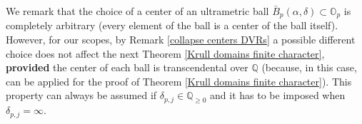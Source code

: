\documentclass[10pt]{article}
\numberwithin{equation}{section}
\newtheorem{Lem}[equation]{Lemma}
\theoremstyle{definition}
\newtheorem{Def}[equation]{Definition}
\theoremstyle{definition}
\newcommand{\Q}{\mathbb{Q}}
\newcommand{\Z}{\mathbb{Z}}
\renewcommand{\O}{\mathbb{O}}
\newcommand{\PP}{\mathbb{P}}
\newcommand\rc { \color{red}}
\begin{document}
We remark that the choice of a center of an ultrametric ball $\bar B_p(\alpha,\delta)\subset \O_p$ is completely arbitrary (every element of the ball is a center of the ball itself). However, for our scopes, by Remark \ref{collapse centers DVRs}
 a possible different choice does not affect the next Theorem \ref{Krull domains finite character}, \textbf{provided} the center of each  ball is transcendental over $\Q$ 
  (because, in this case, \cite[Lemma 2.12]{PerDedekind} can be applied for the proof of Theorem \ref{Krull domains finite character}). This property can always be assumed if $\delta_{p,j}\in\Q_{\geq0}$ and it has to be imposed when $\delta_{p,j}=\infty$.
\vskip0.5cm
\end{document}

